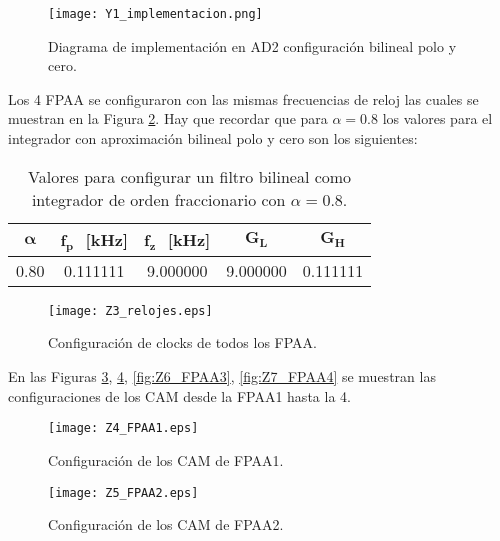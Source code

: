 	\begin{figure}[!ht]
		\caption{Diagrama de implementación en AD2 configuración bilineal polo y cero.} 
		\label{fig:Y1_implementacion}
		\centering
		\texttt{[image: Y1\_implementacion.png]}
	\end{figure}
	
	Los 4 FPAA se configuraron con las mismas frecuencias de reloj las cuales se muestran en la Figura \ref{fig:Z3_relojes}. Hay que recordar que para $\alpha = 0.8$ los valores para el integrador con aproximación bilineal polo y cero son los siguientes:
	
	\begin{table}[!hbp]                                      
		\centering   
		\caption{Valores para configurar un filtro bilineal como integrador de orden fraccionario con $\alpha = 0.8$.}                            
		\label{tab:respaso}                                        
			\begin{tabular}{ccccc}                        
			\hline                                              
			$\bm{\alpha}$ & $\bm{f_{p}}\,\,$ [kHz] & $\bm{f_{z}}\,\,$ [kHz] & $\bm{G_{L}}$ & $\bm{G_{H}}$ \\            
			\hline                                                                                       
			0.80 & 0.111111 & 9.000000 & 9.000000 & 0.111111 \\  
			\hline                                              
			\end{tabular}                                                                
	\end{table} 
	\begin{figure}[!ht] 
		\caption{Configuración de clocks de todos los FPAA.}
		\label{fig:Z3_relojes}
		\centering
		\texttt{[image: Z3\_relojes.eps]}
	\end{figure}
	
	En las Figuras \ref{fig:Z4_FPAA1}, \ref{fig:Z5_FPAA2}, \ref{fig:Z6_FPAA3}, \ref{fig:Z7_FPAA4} se muestran las configuraciones de los CAM desde la FPAA1 hasta la 4.
	\begin{figure}[!ht] 
		\caption{Configuración de los CAM de FPAA1.}
		\label{fig:Z4_FPAA1}
		\centering
		\texttt{[image: Z4\_FPAA1.eps]}
	\end{figure}
	
	\begin{figure}[!ht] 
		\caption{Configuración de los CAM de FPAA2.}
		\label{fig:Z5_FPAA2}
		\centering
		\texttt{[image: Z5\_FPAA2.eps]}
	\end{figure}
	
